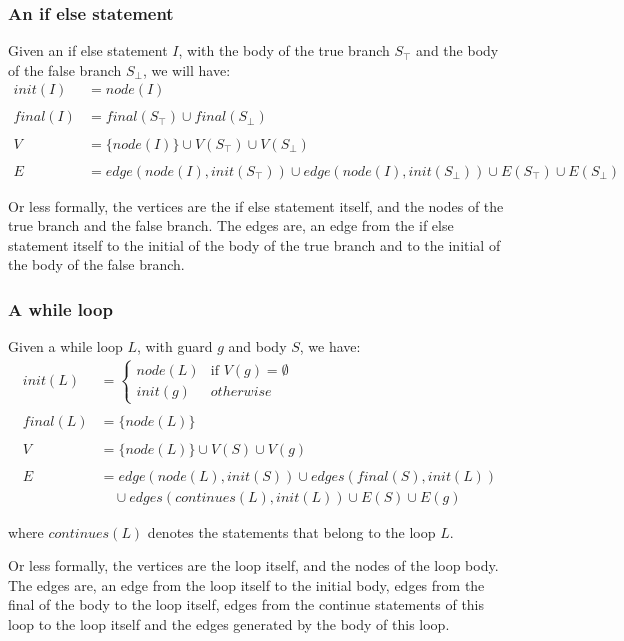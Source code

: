 \subsubsection*{An if else statement}
Given an if else statement $I$, with the body of the true branch $S_\top$ and the
body of the false branch $S_\bot$, we will have:
\begin{align*}
    init(I)  &= node(I) \\ \\
    final(I) &= final(S_\top) \cup final(S_\bot) \\ \\
    V        &= \{node(I)\} \cup V(S_\top) \cup V(S_\bot) \\ \\
    E        &= edge(node(I), init(S_\top)) \cup edge(node(I), init(S_\bot)) 
                \cup E(S_\top) \cup E(S_\bot)
\end{align*}

Or less formally, the vertices are the if else statement itself, and the nodes
of the true branch and the false branch. The edges are, an edge from the 
if else statement itself to the initial of the body of the true branch and to
the initial of the body of the false branch.

\subsubsection*{A while loop}
Given a while loop $L$, with guard $g$ and body $S$, we have:
\begin{align*}
    init(L) &=
    \begin{cases}
      node(L) & \text{if } V(g) = \emptyset \\
      init(g) & otherwise
    \end{cases} \\ \\
    final(L) &= \{node(L)\} \\ \\
    V &= \{node(L)\} \cup V(S) \cup V(g) \\ \\
    E &= edge(node(L), init(S)) \cup edges(final(S), init(L))
       \\ & \quad \cup edges(continues(L), init(L)) \cup E(S) \cup E(g)
\end{align*}

where $continues(L)$ denotes the  statements that belong
to the loop $L$.

Or less formally, the vertices are the loop itself, and the nodes of the loop 
body. The edges are, an edge from the loop itself to the initial body, edges from
the final of the body to the loop itself, edges from the continue statements of
this loop to the loop itself and the edges generated by the body of this loop.

